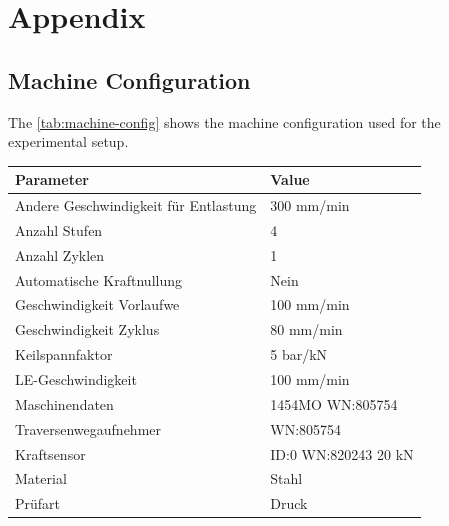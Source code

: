 \chapter{Appendix}\label{ch:appendix}

\section{Machine Configuration}\label{sec:machine-configuration}

The \cref{tab:machine-config} shows the machine configuration used for the experimental setup.

\begin{table}[H]
    \begin{tcolorbox}[arc=0pt,boxrule=0.5pt]
        \centering
        \begin{tabular}{ll}
            \toprule
            \textbf{Parameter} & \textbf{Value}
            \\
            \toprule
            Andere Geschwindigkeit für Entlastung & 300 mm/min           \\
            Anzahl Stufen                         & 4                    \\
            Anzahl Zyklen                         & 1                    \\
            Automatische Kraftnullung             & Nein                 \\
            Geschwindigkeit Vorlaufwe             & 100 mm/min           \\
            Geschwindigkeit Zyklus                & 80 mm/min            \\
            Keilspannfaktor                       & 5 bar/kN             \\
            LE-Geschwindigkeit                    & 100 mm/min           \\
            \hdashline
            Maschinendaten                        & 1454MO WN:805754     \\
            Traversenwegaufnehmer                 & WN:805754            \\
            Kraftsensor                           & ID:0 WN:820243 20 kN \\
            \hdashline
            Material                              & Stahl                \\
            Prüfart                               & Druck                \\

\end{tabular}
\end{tcolorbox}
\end{table}
